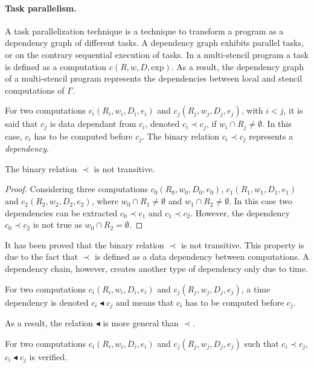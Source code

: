 \paragraph{Task parallelism.}
A task parallelization technique is a technique to transform a program as a dependency graph of different tasks. A dependency graph exhibits parallel tasks, or on the contrary sequential execution of tasks. In a multi-stencil program a task is defined as a computation $c(R,w,D,\text{exp})$. As a result, the dependency graph of a multi-stencil program represents the dependencies between local and stencil computations of $\Gamma$.

\begin{mydef}
For two computations $c_i(R_i,w_i,D_i,e_i)$ and $c_j(R_j,w_j,D_j,e_j)$, with $i < j$, it is said that $c_j$ is data dependant from $c_i$, denoted $c_i\prec c_j$, if $w_i \cap R_j \neq \emptyset$. In this case, $c_i$ has to be computed before $c_j$. The binary relation $c_i\prec c_j$ represents a \textit{dependency}.
\end{mydef}

\begin{myprop}
The binary relation $\prec$ is not transitive. 
\end{myprop}

\begin{proof}
Considering three computations $c_0(R_0,w_0,D_0,e_0)$, $c_1(R_1,w_1,D_1,e_1)$ and $c_2(R_2,w_2,D_2,e_2)$, where $w_0\cap R_1 \neq \emptyset$ and $w_1\cap R_2 \neq \emptyset$. In this case two dependencies can be extracted $c_0 \prec c_1$ and $c_1 \prec c_2$. However, the dependency $c_0 \prec c_2$ is not true as $w_0\cap R_2 = \emptyset$.
\end{proof}

It has been proved that the binary relation $\prec$ is not transitive. This property is due to the fact that $\prec$ is defined as a data dependency between computations. A dependency chain, however, creates another type of dependency only due to time.

\begin{mydef}
For two computations $c_i(R_i,w_i,D_i,e_i)$ and $c_j(R_j,w_j,D_j,e_j)$, a time dependency is denoted $c_i \blacktriangleleft c_j$ and means that $c_i$ has to be computed before $c_j$.
\end{mydef}

As a result, the relation $\blacktriangleleft$ is more general than $\prec$.

\begin{myprop}
For two computations $c_i(R_i,w_i,D_i,e_i)$ and $c_j(R_j,w_j,D_j,e_j)$ such that $c_i \prec c_j$, $c_i \blacktriangleleft c_j$ is verified.
\end{myprop}

